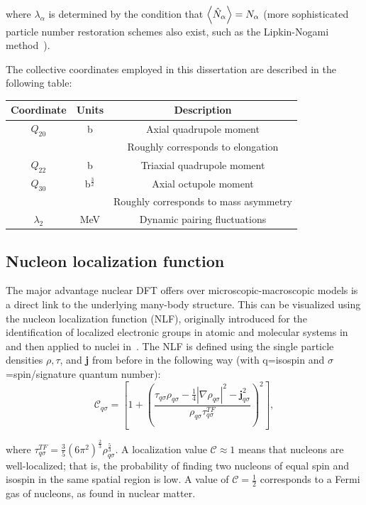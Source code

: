 \noindent where $\lambda_\alpha$ is determined by the condition that $\expval{\hat{N}_\alpha} = N_\alpha$ (more sophisticated particle number restoration schemes also exist, such as the Lipkin-Nogami method~\cite{Stoitsov2007, Lipkin1960, Nogami1964, Pradhan1973, Flocard1997}). %

The collective coordinates employed in this dissertation are described in the following table:


\begin{tabular}{|ccc|}
	\hline \textbf{Coordinate} & \textbf{Units} & \textbf{Description} \\ \hline
	$Q_{20}$ & b & Axial quadrupole moment \\
	& & Roughly corresponds to elongation \\
	$Q_{22}$ & b & Triaxial quadrupole moment \\
	$Q_{30}$ & b$^\frac{3}{2}$ & Axial octupole moment \\
	& & Roughly corresponds to mass asymmetry \\
	$\lambda_{2}$ & MeV & Dynamic pairing fluctuations \\ \hline
\end{tabular} 

\subsection{Nucleon localization function}\label{sect:locali}
The major advantage nuclear DFT offers over microscopic-macroscopic models is a direct link to the underlying many-body structure. This can be visualized using the nucleon localization function (NLF), originally introduced for the identification of localized electronic groups in atomic and molecular systems in~\cite{Becke1990} and then applied to nuclei in~\cite{Reinhard2011,Zhang2016}. The NLF is defined using the single particle densities $\rho, \tau$, and \textbf{j} from before in the following way (with q=isospin and $\sigma$=spin/signature quantum number):
\begin{equation}
\mathcal{C}_{q\sigma} = \left[1+\left(\frac{\tau_{q\sigma}\rho_{q\sigma}-\frac{1}{4}|\nabla\rho_{q\sigma}|^2-\mathbf{j}^2_{q\sigma}}{\rho_{q\sigma}\tau_{q\sigma}^{TF}}\right)^2\right],
\end{equation}

\noindent where $\tau_{q\sigma}^{TF}=\frac{3}{5}(6\pi^2)^\frac{2}{3}\rho_{q\sigma}^\frac{5}{3}$. A localization value $\mathcal{C} \approx 1$ means that nucleons are well-localized; that is, the probability of finding two nucleons of equal spin and isospin in the same spatial region is low. A value of $\mathcal{C}=\frac{1}{2}$ corresponds to a Fermi gas of nucleons, as found in nuclear matter.

